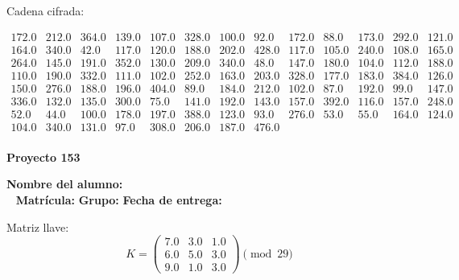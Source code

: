 \documentclass[12pt]{article}
\begin{document}
Cadena cifrada:
\begin{center}
$\begin{array}{lllllllllllll}
172.0 & 212.0 & 364.0 & 139.0 & 107.0 & 328.0 & 100.0 & 92.0 & 172.0 & 88.0 & 173.0 & 292.0 & 121.0\\
164.0 & 340.0 & 42.0 & 117.0 & 120.0 & 188.0 & 202.0 & 428.0 & 117.0 & 105.0 & 240.0 & 108.0 & 165.0\\
264.0 & 145.0 & 191.0 & 352.0 & 130.0 & 209.0 & 340.0 & 48.0 & 147.0 & 180.0 & 104.0 & 112.0 & 188.0\\
110.0 & 190.0 & 332.0 & 111.0 & 102.0 & 252.0 & 163.0 & 203.0 & 328.0 & 177.0 & 183.0 & 384.0 & 126.0\\
150.0 & 276.0 & 188.0 & 196.0 & 404.0 & 89.0 & 184.0 & 212.0 & 102.0 & 87.0 & 192.0 & 99.0 & 147.0\\
336.0 & 132.0 & 135.0 & 300.0 & 75.0 & 141.0 & 192.0 & 143.0 & 157.0 & 392.0 & 116.0 & 157.0 & 248.0\\
52.0 & 44.0 & 100.0 & 178.0 & 197.0 & 388.0 & 123.0 & 93.0 & 276.0 & 53.0 & 55.0 & 164.0 & 124.0\\
104.0 & 340.0 & 131.0 & 97.0 & 308.0 & 206.0 & 187.0 & 476.0\\
\end{array}$
\end{center}

\newpage


\textbf{Proyecto 153}

\textbf{Nombre del alumno:} \underline{\hspace{13cm}}\\\
\vspace{1cm}
\textbf{Matrícula:} \underline{\hspace{4cm}} \hspace{1cm}
\textbf{Grupo:} \underline{\hspace{2cm}}
\textbf{Fecha de entrega:} \underline{\hspace{2cm}}

\medskip

Matriz llave:
\[
K = \begin{pmatrix}
7.0 & 3.0 & 1.0\\
6.0 & 5.0 & 3.0\\
9.0 & 1.0 & 3.0
\end{pmatrix} \pmod{29}
\]
\end{document}
